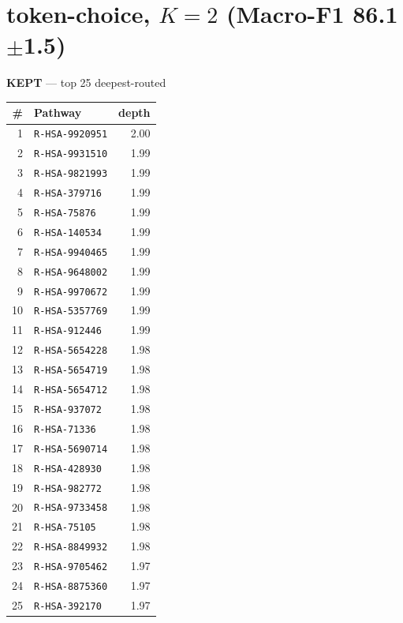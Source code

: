 \documentclass[10pt]{article}
\begin{document}
\section*{token-choice, $K=2$  (Macro-F1 86.1$\pm$1.5)}
\filbreak
\begin{minipage}[t]{0.48\textwidth}\centering\textbf{\color{green!45!black}KEPT} --- top 25 deepest-routed\\[3pt]
\begin{tabular}{@{}r l r@{}}
\toprule
\# & Pathway & depth \\
\midrule
1 & \texttt{R-HSA-9920951} & 2.00 \\
2 & \texttt{R-HSA-9931510} & 1.99 \\
3 & \texttt{R-HSA-9821993} & 1.99 \\
4 & \texttt{R-HSA-379716} & 1.99 \\
5 & \texttt{R-HSA-75876} & 1.99 \\
6 & \texttt{R-HSA-140534} & 1.99 \\
7 & \texttt{R-HSA-9940465} & 1.99 \\
8 & \texttt{R-HSA-9648002} & 1.99 \\
9 & \texttt{R-HSA-9970672} & 1.99 \\
10 & \texttt{R-HSA-5357769} & 1.99 \\
11 & \texttt{R-HSA-912446} & 1.99 \\
12 & \texttt{R-HSA-5654228} & 1.98 \\
13 & \texttt{R-HSA-5654719} & 1.98 \\
14 & \texttt{R-HSA-5654712} & 1.98 \\
15 & \texttt{R-HSA-937072} & 1.98 \\
16 & \texttt{R-HSA-71336} & 1.98 \\
17 & \texttt{R-HSA-5690714} & 1.98 \\
18 & \texttt{R-HSA-428930} & 1.98 \\
19 & \texttt{R-HSA-982772} & 1.98 \\
20 & \texttt{R-HSA-9733458} & 1.98 \\
21 & \texttt{R-HSA-75105} & 1.98 \\
22 & \texttt{R-HSA-8849932} & 1.98 \\
23 & \texttt{R-HSA-9705462} & 1.97 \\
24 & \texttt{R-HSA-8875360} & 1.97 \\
25 & \texttt{R-HSA-392170} & 1.97 \\
\bottomrule
\end{tabular}
\end{minipage}\hfill
\end{document}
